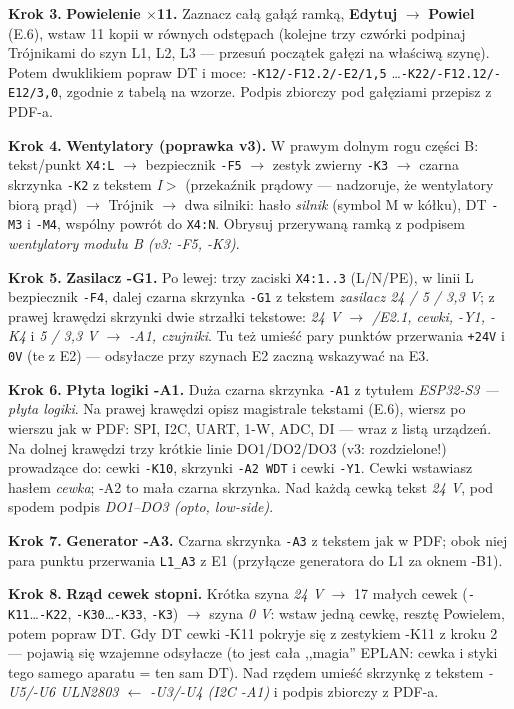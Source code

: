 \documentclass[11pt,a4paper]{article}
\newcommand{\ui}[1]{\textbf{#1}}                    %
\newcommand{\krok}[1]{\par\medskip\noindent\textbf{\color{granat}Krok #1.}\space}
\begin{document}
\krok{3} \textbf{Powielenie $\times$11.} Zaznacz całą gałąź ramką, \ui{Edytuj} $\to$ \ui{Powiel}
(E.6), wstaw 11 kopii w równych odstępach (kolejne trzy czwórki podpinaj Trójnikami do szyn L1,
L2, L3 --- przesuń początek gałęzi na właściwą szynę). Potem dwuklikiem popraw DT i moce:
\texttt{-K12/-F12.2/-E2/1,5} \ldots \texttt{-K22/-F12.12/-E12/3,0}, zgodnie z tabelą na
wzorze. Podpis zbiorczy pod gałęziami przepisz z PDF-a.

\krok{4} \textbf{Wentylatory (poprawka v3).} W prawym dolnym rogu części B: tekst/punkt
\texttt{X4:L} $\to$ bezpiecznik \texttt{-F5} $\to$ zestyk zwierny \texttt{-K3} $\to$ czarna
skrzynka \texttt{-K2} z tekstem \emph{I$>$} (przekaźnik prądowy --- nadzoruje, że wentylatory
biorą prąd) $\to$ Trójnik $\to$ dwa silniki: hasło \emph{silnik} (symbol M w kółku), DT
\texttt{-M3} i \texttt{-M4}, wspólny powrót do \texttt{X4:N}. Obrysuj przerywaną ramką
z podpisem \emph{wentylatory modułu B (v3: -F5, -K3)}.

\krok{5} \textbf{Zasilacz -G1.} Po lewej: trzy zaciski \texttt{X4:1..3} (L/N/PE), w linii L
bezpiecznik \texttt{-F4}, dalej czarna skrzynka \texttt{-G1} z tekstem \emph{zasilacz
24 / 5 / 3,3 V}; z prawej krawędzi skrzynki dwie strzałki tekstowe: \emph{24 V $\to$ /E2.1,
cewki, -Y1, -K4} i \emph{5 / 3,3 V $\to$ -A1, czujniki}. Tu też umieść pary punktów przerwania
\texttt{+24V} i \texttt{0V} (te z E2) --- odsyłacze przy szynach E2 zaczną wskazywać na E3.

\krok{6} \textbf{Płyta logiki -A1.} Duża czarna skrzynka \texttt{-A1} z tytułem
\emph{ESP32-S3 --- płyta logiki}. Na prawej krawędzi opisz magistrale tekstami (E.6), wiersz po
wierszu jak w PDF: SPI, I2C, UART, 1-W, ADC, DI --- wraz z listą urządzeń. Na dolnej krawędzi
trzy krótkie linie DO1/DO2/DO3 (v3: rozdzielone!) prowadzące do: cewki \texttt{-K10}, skrzynki
\texttt{-A2 WDT} i cewki \texttt{-Y1}. Cewki wstawiasz hasłem \emph{cewka}; -A2 to mała czarna
skrzynka. Nad każdą cewką tekst \emph{24 V}, pod spodem podpis \emph{DO1--DO3 (opto, low-side)}.

\krok{7} \textbf{Generator -A3.} Czarna skrzynka \texttt{-A3} z tekstem jak w PDF; obok niej
para punktu przerwania \texttt{L1\_A3} z E1 (przyłącze generatora do L1 za oknem -B1).

\krok{8} \textbf{Rząd cewek stopni.} Krótka szyna \emph{24 V} $\to$ 17 małych cewek
(\texttt{-K11}\ldots\texttt{-K22}, \texttt{-K30}\ldots\texttt{-K33}, \texttt{-K3}) $\to$ szyna
\emph{0 V}: wstaw jedną cewkę, resztę Powielem, potem popraw DT. Gdy DT cewki -K11 pokryje się
z zestykiem -K11 z kroku 2 --- pojawią się wzajemne odsyłacze (to jest cała ,,magia'' EPLAN:
cewka i styki tego samego aparatu = ten sam DT). Nad rzędem umieść skrzynkę z tekstem
\emph{-U5/-U6 ULN2803 $\leftarrow$ -U3/-U4 (I2C -A1)} i podpis zbiorczy z PDF-a.
\end{document}
